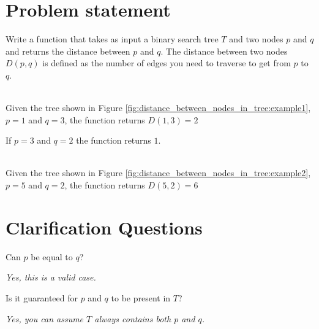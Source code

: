 \section{Problem statement}
\label{sec:distance_between_nodes_in_tree:problem}
\begin{exercise}
	Write a function that takes as input a binary search tree $T$ and two nodes $p$ and $q$ and
	returns the distance between $p$ and $q$. The distance between two nodes $D(p,q)$ is defined as
	the number of edges you need to traverse to get from $p$ to $q$.
	
	\begin{example}
		\hfill \\
		Given the tree shown in Figure \ref{fig:distance_between_nodes_in_tree:example1}, $p = 1$
		and $q=3$, the function returns $D(1,3)=2$ 
		
		If $p=3$ and $q=2$ the function returns $1$.
	\label{ex:distance_between_nodes_in_tree:example1}
	\end{example}

	\begin{example}
		\hfill \\
		Given the tree shown in Figure \ref{fig:distance_between_nodes_in_tree:example2}, $p = 5$
		and $q=2$, the function returns $D(5,2)=6$ 
		\label{ex:distance_between_nodes_in_tree:example2}
	\end{example}
\end{exercise}

\section{Clarification Questions}

\begin{QandA}
	\begin{questionitem} \begin{question} Can $p$ be equal to $q$?  \end{question} 	 
    \begin{answered}
		\textit{Yes, this is a valid case.}
	\end{answered} \end{questionitem}
	
	\begin{questionitem} \begin{question} Is it guaranteed for  $p$ and  $q$ to be present in $T$?  \end{question} 	 
    \begin{answered}
		\textit{Yes, you can assume $T$ always contains both $p$ and $q$.}
	\end{answered} \end{questionitem}

\end{QandA}


